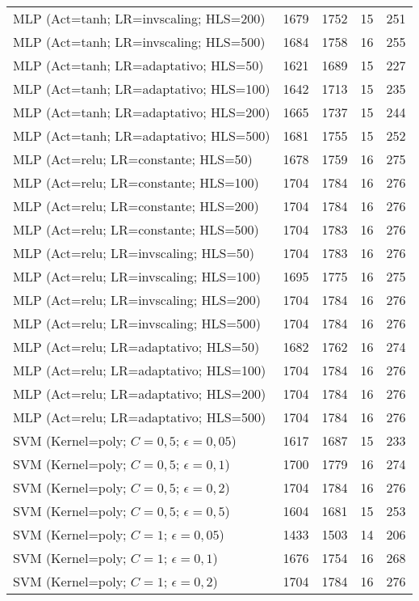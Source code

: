 \begin{center}
\begin{longtable}{|l|l|l|l|l|}
MLP (Act=tanh; LR=invscaling; HLS=200) & 1679 & 1752 & 15 & 251 \\
MLP (Act=tanh; LR=invscaling; HLS=500) & 1684 & 1758 & 16 & 255 \\
MLP (Act=tanh; LR=adaptativo; HLS=50) & 1621 & 1689 & 15 & 227 \\
MLP (Act=tanh; LR=adaptativo; HLS=100) & 1642 & 1713 & 15 & 235 \\
MLP (Act=tanh; LR=adaptativo; HLS=200) & 1665 & 1737 & 15 & 244 \\
MLP (Act=tanh; LR=adaptativo; HLS=500) & 1681 & 1755 & 15 & 252 \\
MLP (Act=relu; LR=constante; HLS=50) & 1678 & 1759 & 16 & 275 \\
MLP (Act=relu; LR=constante; HLS=100) & 1704 & 1784 & 16 & 276 \\
MLP (Act=relu; LR=constante; HLS=200) & 1704 & 1784 & 16 & 276 \\
MLP (Act=relu; LR=constante; HLS=500) & 1704 & 1783 & 16 & 276 \\
MLP (Act=relu; LR=invscaling; HLS=50) & 1704 & 1783 & 16 & 276 \\
MLP (Act=relu; LR=invscaling; HLS=100) & 1695 & 1775 & 16 & 275 \\
MLP (Act=relu; LR=invscaling; HLS=200) & 1704 & 1784 & 16 & 276 \\
MLP (Act=relu; LR=invscaling; HLS=500) & 1704 & 1784 & 16 & 276 \\
MLP (Act=relu; LR=adaptativo; HLS=50) & 1682 & 1762 & 16 & 274 \\
MLP (Act=relu; LR=adaptativo; HLS=100) & 1704 & 1784 & 16 & 276 \\
MLP (Act=relu; LR=adaptativo; HLS=200) & 1704 & 1784 & 16 & 276 \\
MLP (Act=relu; LR=adaptativo; HLS=500) & 1704 & 1784 & 16 & 276 \\
SVM (Kernel=poly; $C=0,5$; $\epsilon=0,05$) & 1617 & 1687 & 15 & 233 \\
SVM (Kernel=poly; $C=0,5$; $\epsilon=0,1$) & 1700 & 1779 & 16 & 274 \\
SVM (Kernel=poly; $C=0,5$; $\epsilon=0,2$) & 1704 & 1784 & 16 & 276 \\
SVM (Kernel=poly; $C=0,5$; $\epsilon=0,5$) & 1604 & 1681 & 15 & 253 \\
SVM (Kernel=poly; $C=1$; $\epsilon=0,05$) & 1433 & 1503 & 14 & 206 \\
SVM (Kernel=poly; $C=1$; $\epsilon=0,1$) & 1676 & 1754 & 16 & 268 \\
SVM (Kernel=poly; $C=1$; $\epsilon=0,2$) & 1704 & 1784 & 16 & 276 \\

\end{longtable}
\end{center}
